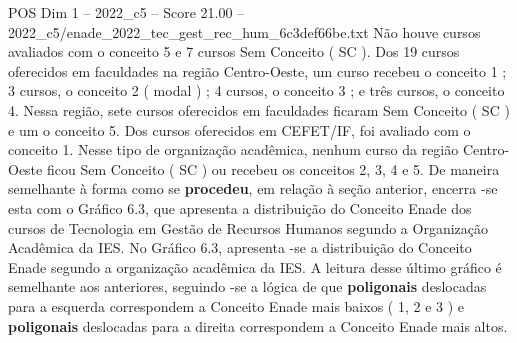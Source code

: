 \begin{textsample}{POS Dim 1 – 2022\_c5 – Score 21.00 – 2022\_c5/enade\_2022\_tec\_gest\_rec\_hum\_6c3def66be.txt}
Não houve cursos avaliados com o conceito 5 e 7 cursos Sem Conceito ( SC ).
Dos 19 cursos oferecidos em faculdades na região Centro-Oeste, um curso recebeu o conceito 1 ; 3 cursos, o conceito 2 ( modal ) ; 4 cursos, o conceito 3 ; e três cursos, o conceito 4.
Nessa região, sete cursos oferecidos em faculdades ficaram Sem Conceito ( SC ) e um o conceito 5.
Dos cursos oferecidos em CEFET/IF, foi avaliado com o conceito 1.
Nesse tipo de organização acadêmica, nenhum curso da região Centro-Oeste ficou Sem Conceito ( SC ) ou recebeu os conceitos 2, 3, 4 e 5.
De maneira semelhante à forma como se \textbf{procedeu}, em relação à seção anterior, encerra -se esta com o Gráfico 6.3, que apresenta a distribuição do Conceito Enade dos cursos de Tecnologia em Gestão de Recursos Humanos segundo a Organização Acadêmica da IES.
No Gráfico 6.3, apresenta -se a distribuição do Conceito Enade segundo a organização acadêmica da IES.
A leitura desse último gráfico é semelhante aos anteriores, seguindo -se a lógica de que \textbf{poligonais} deslocadas para a esquerda correspondem a Conceito Enade mais baixos ( 1, 2 e 3 ) e \textbf{poligonais} deslocadas para a direita correspondem a Conceito Enade mais altos.

\end{textsample}
